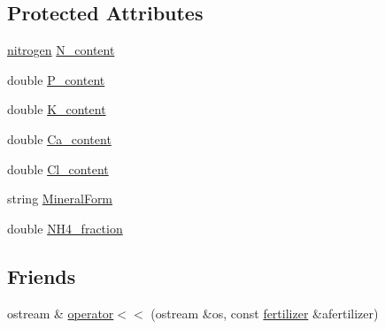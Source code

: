 \subsection*{Protected Attributes}
\begin{DoxyCompactItemize}
\item 
\hyperlink{classnitrogen}{nitrogen} \hyperlink{classfertilizer_af6513d3d34f339522280ee00f8c44f3e}{N\_\-content}
\item 
double \hyperlink{classfertilizer_a2e586559d4fb3b123391ee4c7815f166}{P\_\-content}
\item 
double \hyperlink{classfertilizer_ae63c55759fdc6bf9bb65c8138179b3a6}{K\_\-content}
\item 
double \hyperlink{classfertilizer_a600c30df6f51d426d0d62d4a1b0beab6}{Ca\_\-content}
\item 
double \hyperlink{classfertilizer_abae61b73ba06463e0c9c854dc323a099}{Cl\_\-content}
\item 
string \hyperlink{classfertilizer_a1984791c7e4363c98d2dd3655a192c60}{MineralForm}
\item 
double \hyperlink{classfertilizer_a9fff79dfc73ee1cde5edaef8b74813d0}{NH4\_\-fraction}
\end{DoxyCompactItemize}
\subsection*{Friends}
\begin{DoxyCompactItemize}
\item 
ostream \& \hyperlink{classfertilizer_a5a2254ccb8f746d7d2c66c39a00a3f18}{operator$<$$<$} (ostream \&os, const \hyperlink{classfertilizer}{fertilizer} \&afertilizer)
\end{DoxyCompactItemize}


